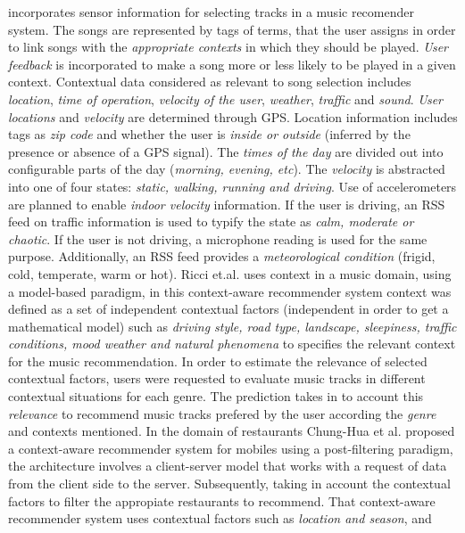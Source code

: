 incorporates sensor information for selecting tracks in a music recomender system.
The songs are represented by tags of terms, that the user assigns in order to link
songs with the \textit{appropriate contexts} in which they should be played.
\textit{User feedback} is incorporated to make a song more or less likely to be
played in a given context. Contextual data considered as relevant to song selection
includes \textit{location}, \textit{time of operation}, \textit{velocity of the user}, 
\textit{weather}, \textit{traffic} and \textit{sound}. \textit{User locations} and 
\textit{velocity} are determined through GPS.
Location information includes tags as \textit{zip code} and whether the
user is \textit{inside or outside} (inferred by the presence or absence of a
GPS signal). The \textit{times of the day} are divided out into configurable
parts of the day (\textit{morning, evening, etc}). The \textit{velocity} is 
abstracted into one of four states: \textit{static, walking, running and driving}.  
Use of accelerometers are planned to enable \textit{indoor velocity}
information. If the user is driving, an RSS feed on traffic information 
is used to typify the state as \textit{calm, moderate or chaotic}. If the user is not
driving, a microphone reading is used for the same purpose.
Additionally, an RSS feed provides a \textit{meteorological condition} (frigid,
cold, temperate, warm or hot).
Ricci et.al. \cite{baltrunas2011incarmusic} uses
context in a music domain, using a model-based paradigm, in this
context-aware recommender system context was defined as a set of
independent contextual factors (independent in order to get a
mathematical model) such as \textit{driving style, road type,
landscape, sleepiness, traffic conditions, mood weather and natural
phenomena} to specifies the relevant context for the music
recommendation. In order to estimate the relevance of selected
contextual factors, users were requested to evaluate music tracks
in different contextual situations for each genre. The prediction
takes in to account this \textit{relevance} to recommend music tracks 
prefered by the user according the \textit{genre} and contexts mentioned.
In the domain of restaurants Chung-Hua et al. \cite{chu2013chinese} proposed a
context-aware recommender system for mobiles using a post-filtering
paradigm, the architecture involves a  client-server model that works
with a request of data from the client side to the server.
Subsequently, taking in account the contextual factors to filter the
appropiate restaurants to recommend. That context-aware recommender
system uses contextual factors such as \textit{location and season}, and

